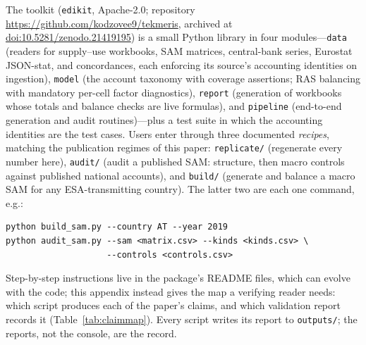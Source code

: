 The toolkit (\texttt{edikit}, Apache-2.0; repository
\url{https://github.com/kodzovee9/tekmeris}, archived at
\href{https://doi.org/10.5281/zenodo.21419195}{doi:10.5281/zenodo.21419195})
is a small Python library in four modules---\texttt{data} (readers for supply--use workbooks, SAM
matrices, central-bank series, Eurostat JSON-stat, and concordances, each
enforcing its source's accounting identities on ingestion),
\texttt{model} (the account taxonomy with coverage assertions; RAS
balancing with mandatory per-cell factor diagnostics), \texttt{report}
(generation of workbooks whose totals and balance checks are live
formulas), and \texttt{pipeline} (end-to-end generation and audit
routines)---plus a test suite in which the accounting identities are the
test cases. Users enter through three documented \emph{recipes},
matching the publication regimes of this paper: \texttt{replicate/}
(regenerate every number here), \texttt{audit/} (audit a published SAM:
structure, then macro controls against published national accounts), and
\texttt{build/} (generate and balance a macro SAM for any
ESA-transmitting country). The latter two are each one command, e.g.:

{\small
\begin{verbatim}
python build_sam.py --country AT --year 2019
python audit_sam.py --sam <matrix.csv> --kinds <kinds.csv> \
                    --controls <controls.csv>
\end{verbatim}}

\noindent Step-by-step instructions live in the package's README files,
which can evolve with the code; this appendix instead gives the map a
verifying reader needs: which script produces each of the paper's
claims, and which validation report records it
(Table~\ref{tab:claimmap}). Every script writes its report to
\texttt{outputs/}; the reports, not the console, are the record.

